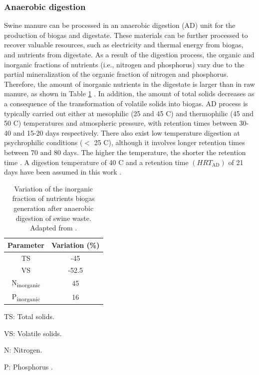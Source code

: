 \begin{refsection}[referencesCh6]
\subsubsection{Anaerobic digestion}
Swine manure can be processed in an anaerobic digestion (AD) unit for the production of biogas and digestate. These materials can be further processed to recover valuable resources, such as electricity and thermal energy from biogas, and nutrients from digestate. As a result of the digestion process, the organic and inorganic fractions of nutrients (i.e., nitrogen and phosphorus) vary due to the partial mineralization of the organic fraction of nitrogen and phosphorus. Therefore, the amount of inorganic nutrients in the digestate is larger than in raw manure, as shown in Table \ref{table:ADWaste} \citep{fangueiro2020available}. In addition, the amount of total solids decreases as a consequence of the transformation of volatile solids into biogas. AD process is typically carried out either at mesophilic (25 and 45 \textdegree C) and thermophilic (45 and 50 \textdegree C) temperatures and atmospheric pressure, with retention times between 30-40 and 15-20 days respectively. There also exist low temperature digestion at psychrophilic conditions ($<$ 25 \textdegree C), although it involves longer retention times between 70 and 80 days. The higher the temperature, the shorter the retention time \citep{Seadi2008}. A digestion temperature  of 40 \textdegree C and a retention time $\left( {HRT}_{\text{AD}} \right) $ of 21 days have been assumed in this work \citep{bolzonella2018nutrients}. 

\begin{table}[h] 
	\centering
	\caption{Variation of the inorganic fraction of nutrients biogas generation after anaerobic digestion of swine waste. Adapted from \protect\citet{fangueiro2020available}.} \label{table:ADWaste}
	\begin{threeparttable}
		\begin{tabular}{@{}cc@{}}
			\toprule
			Parameter      & Variation (\%) \\ \midrule
			TS             & -45            \\
			VS             & -52.5          \\
			N\textsubscript{inorganic}         & 45             \\
			P\textsubscript{inorganic}         & 16             \\
			\bottomrule
		\end{tabular}
		\begin{tablenotes}
			\item TS: Total solids.
			\item VS: Volatile solids.
			\item N: Nitrogen.
			\item P: Phosphorus
			.
		\end{tablenotes}
	\end{threeparttable}
\end{table}


\end{refsection}
